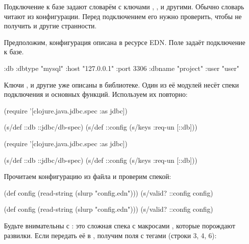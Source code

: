 Подключение к базе задают словарём с ключами , ,
 и другими. Обычно словарь читают из конфигурации. Перед
подключением его нужно проверить, чтобы не получить  и другие
странности.


Предположим, конфигурация описана в ресурсе EDN. Поле  задаёт
подключение к базе.


\begin{clojure}
{:db {:dbtype "mysql"
      :host "127.0.0.1"
      :port 3306
      :dbname "project"
      :user "user"}}
\end{clojure}

Ключи ,  и другие уже описаны в библиотеке. Один из её
модулей несёт спеки подключения и основных функций. Используем их повторно:

\ifnarrow

\begin{clojure}
(require
  '[clojure.java.jdbc.spec :as jdbc])

(s/def ::db ::jdbc/db-spec)
(s/def ::config (s/keys :req-un [::db]))
\end{clojure}

\else

\begin{clojure}
(require '[clojure.java.jdbc.spec :as jdbc])

(s/def ::db ::jdbc/db-spec)
(s/def ::config (s/keys :req-un [::db]))
\end{clojure}

\fi

\noindent
Прочитаем конфигурацию из файла и проверим спекой:

\ifnarrow

\begin{clojure}
(def config
  (read-string (slurp "config.edn")))
(s/valid? ::config config)
\end{clojure}

\else

\begin{clojure}
(def config (read-string (slurp "config.edn")))
(s/valid? ::config config)
\end{clojure}

\fi

\label{jdbc-conform-warning}


Будьте внимательны с : это сложная спека с макросами
, которые порождают развилки. Если передать её в
, получим поля с тегами (строки 3, 4, 6):

